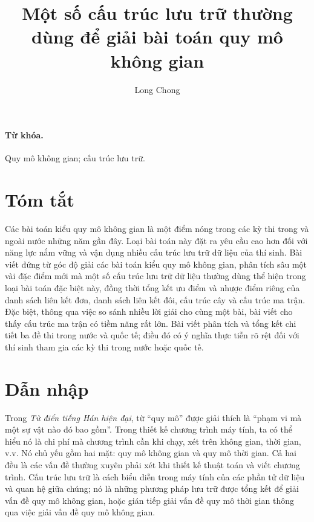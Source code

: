 \documentclass[11pt]{article}
\title{Một số cấu trúc lưu trữ thường dùng để giải bài toán quy mô không gian}
\author{Long Chong}
\date{}
\begin{document}
\maketitle


\renewcommand{\contentsname}{Mục lục}
\tableofcontents

\paragraph{Từ khóa.}
Quy mô không gian; cấu trúc lưu trữ.

\section*{Tóm tắt}

Các bài toán kiểu quy mô không gian là một điểm nóng trong các kỳ thi trong
và ngoài nước những năm gần đây. Loại bài toán này đặt ra yêu cầu cao hơn đối
với năng lực nắm vững và vận dụng nhiều cấu trúc lưu trữ dữ liệu của thí
sinh. Bài viết đứng từ góc độ giải các bài toán kiểu quy mô không gian, phân
tích sâu một vài đặc điểm mới mà một số cấu trúc lưu trữ dữ liệu thường dùng
thể hiện trong loại bài toán đặc biệt này, đồng thời tổng kết ưu điểm và
nhược điểm riêng của danh sách liên kết đơn, danh sách liên kết đôi, cấu trúc
cây và cấu trúc ma trận. Đặc biệt, thông qua việc so sánh nhiều lời giải cho
cùng một bài, bài viết cho thấy cấu trúc ma trận có tiềm năng rất lớn. Bài
viết phân tích và tổng kết chi tiết ba đề thi trong nước và quốc tế; điều đó
có ý nghĩa thực tiễn rõ rệt đối với thí sinh tham gia các kỳ thi trong nước
hoặc quốc tế.

\section{Dẫn nhập}

Trong \textit{Từ điển tiếng Hán hiện đại}, từ ``quy mô'' được giải thích là
``phạm vi mà một sự vật nào đó bao gồm''. Trong thiết kế chương trình máy
tính, ta có thể hiểu nó là chi phí mà chương trình cần khi chạy, xét trên
không gian, thời gian, v.v. Nó chủ yếu gồm hai mặt: quy mô không gian và quy
mô thời gian. Cả hai đều là các vấn đề thường xuyên phải xét khi thiết kế
thuật toán và viết chương trình. Cấu trúc lưu trữ là cách biểu diễn trong máy
tính của các phần tử dữ liệu và quan hệ giữa chúng; nó là những phương pháp
lưu trữ được tổng kết để giải vấn đề quy mô không gian, hoặc gián tiếp giải
vấn đề quy mô thời gian thông qua việc giải vấn đề quy mô không gian.
\end{document}
